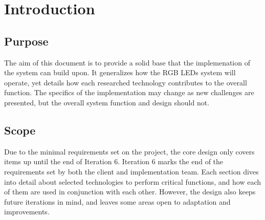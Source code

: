 \documentclass[onecolumn, draftclsnofoot,10pt, compsoc]{IEEEtran}
\begin{document}

	\section{Introduction}

		\subsection{Purpose}
		The aim of this document is to provide a solid base that the implemenation of the system can build upon. It generalizes how the RGB LEDs system
		will operate, yet details how each researched technology contributes to the overall function. The specifics of the implementation may change as new
		challenges are presented, but the overall system function and design should not.

		\subsection{Scope}
		Due to the minimal requirements set on the project, the core design only covers items up until the end of Iteration 6. Iteration 6 marks the end of the
		requirements set by both the client and implementation team. Each section dives into detail	about selected technologies to perform critical functions,
		and how each of them are used in conjunction with each other. However, the design also keeps future iterations in mind, and leaves some areas open to
		adaptation and improvements.
\end{document}
